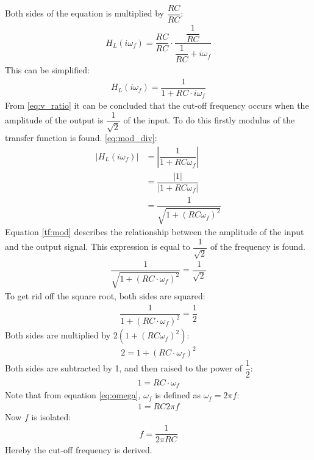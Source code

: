 Both sides of the equation is multiplied by $\dfrac{RC}{RC}$:
\begin{align}
H_{L}(i \omega_f) = \dfrac{RC}{RC} \cdot \dfrac{\dfrac{1}{RC}}{\dfrac{1}{RC}+i \omega_f} 
\end{align}
This can be simplified:
\begin{align}
H_{L}(i \omega_f) =  \dfrac{1}{1+RC \cdot i \omega_f} 
\end{align}
From \eqref{eq:v_ratio} it can be concluded that the cut-off frequency occurs when the amplitude of the output is $\dfrac{1}{\sqrt{2}}$ of the input. To do this firstly modulus of the transfer function is found.
\eqref{eq:mod_div}:
\begin{align}
\left|H_{L}(i \omega_f) \right| &=  \left|\dfrac{1}{1+RC \omega_f} \right| 
\\
&=\dfrac{|1|}{|1+RC\omega_f |}
\\
&=  \dfrac{1}{\sqrt{1+(RC \omega_f)^2}} \label{tf:mod}
\end{align}
Equation \eqref{tf:mod} describes the relationship between the amplitude of the input and the output signal. This expression is equal to $\dfrac{1}{\sqrt{2}}$ of the frequency is found.
\\
\begin{align*}
\dfrac{1}{\sqrt{1+ \left(RC \cdot \omega_f \right)^2}} = \dfrac{1}{\sqrt{2}}
\end{align*}
To get rid off the square root, both sides are squared:
\begin{align*}
\dfrac{1}{1+ \left(RC \cdot \omega_f \right)^2} = \dfrac{1}{2}
\end{align*}
	Both sides are multiplied by $2(1+(RC\omega_f)^2)$:
\begin{align*}
2 = 1+ \left(RC \cdot \omega_f \right)^2
\end{align*}
Both sides are subtracted by 1, and then raised to the power of $\dfrac{1}{2}$:
\begin{align*}
1 = RC \cdot \omega_f 
\end{align*}
Note that from equation \eqref{eq:omega}, $\omega_f$ is defined as $\omega_f=2 \pi f$:
\begin{align*}
1 = RC 2\pi f 
\end{align*}
Now $f$ is isolated:
\begin{align*}
f=\dfrac{1}{2\pi RC}
\end{align*}
Hereby the cut-off frequency is derived.
